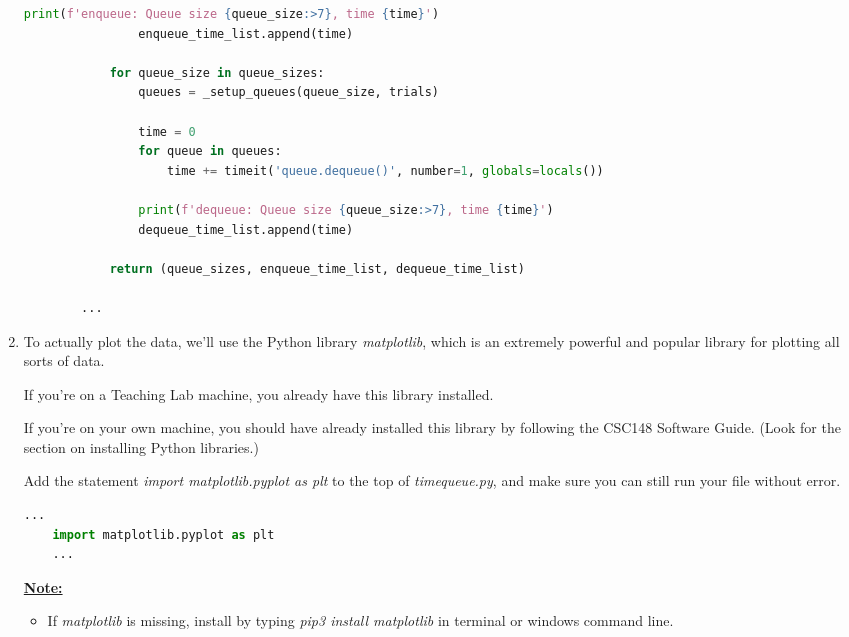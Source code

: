 \documentclass[12pt]{article}
\begin{document}
\begin{enumerate}[1.]
\begin{mdframed}
\begin{lstlisting}[language=Python,caption={task\_4\_q1\_part\_1\_solution.py},captionpos=b]
                print(f'enqueue: Queue size {queue_size:>7}, time {time}')
                enqueue_time_list.append(time)

            for queue_size in queue_sizes:
                queues = _setup_queues(queue_size, trials)

                time = 0
                for queue in queues:
                    time += timeit('queue.dequeue()', number=1, globals=locals())

                print(f'dequeue: Queue size {queue_size:>7}, time {time}')
                dequeue_time_list.append(time)

            return (queue_sizes, enqueue_time_list, dequeue_time_list)

        ...
        \end{lstlisting}
    \end{mdframed}

    \item To actually plot the data, we’ll use the Python library \textit{matplotlib},
    which is an extremely powerful and popular library for plotting all sorts of
    data.

    \bigskip

    If you’re on a Teaching Lab machine, you already have this library installed.

    \bigskip

    If you’re on your own machine, you should have already installed this library
    by following the CSC148 Software Guide. (Look for the section on installing
    Python libraries.)

    \bigskip

    Add the statement \textit{import matplotlib.pyplot as plt} to the top of \textit{timequeue.py},
    and make sure you can still run your file without error.

    \bigskip

    \begin{mdframed}

    \begin{lstlisting}[language=Python,caption={task\_4\_q1\_part\_2\_solution.py},captionpos=b]
    ...
    import matplotlib.pyplot as plt
    ...
    \end{lstlisting}

    \bigskip

    \underline{\textbf{Note:}}

    \begin{itemize}
        \item
        If \textit{matplotlib} is missing, install by typing \textit{pip3 install matplotlib}
        in terminal or windows command line.
    \end{itemize}


\end{mdframed}
\end{enumerate}
\end{document}
